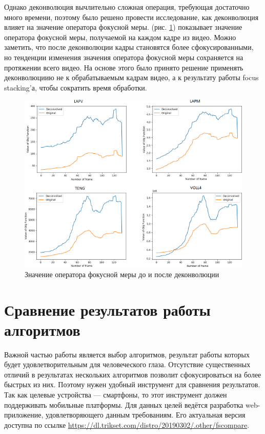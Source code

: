 \documentclass[14pt]{matmex-diploma-custom}
\begin{document}
\newpage

Однако деконволюция вычлительно сложная операция, требующая достаточно много времени, поэтому было решено провести исследование, как деконволюция влияет на значение оператора фокусной меры. (рис. \ref{deconvolution2}) показывает значение оператора фокусной меры, получаемой на каждом кадре из видео. Можно заметить, что после деконволюции кадры становятся более сфокусированными, но тенденции изменения значения оператора фокусной меры сохраняется на протяжении всего видео. На основе этого было принято решение применять деконволюциию не к обрабатываемым кадрам видео, а к результату работы focus stacking'а, чтобы сократить время обработки.

\begin{figure}[h]
\centering
\includegraphics[width=1.0\textwidth]{figures/deconvolution2.png}
\caption{Значение оператора фокусной меры до и после деконволюции}
\label{deconvolution2}
\end{figure}


\section{Сравнение результатов работы алгоритмов}

Важной частью работы является выбор алгоритмов, результат работы которых будет удовлетворительным для человеческого глаза. Отсутствие существенных отличий в результатах нескольких алгоритмов позволит сфокусироваться на более быстрых из них. Поэтому нужен удобный инструмент для сравнения результатов. Так как целевые устройства --- смартфоны, то этот инструмент должен поддерживать мобильные платформы. Для данных целей ведётся разработка web-приложение, удовлетворяющего данным требованиям. Его актуальная версия доступна по ссылке \url{https://dl.trikset.com/distro/20190302/.other/fscompare}. 
\end{document}
